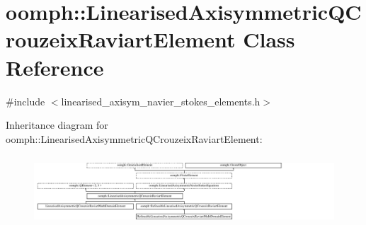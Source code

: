 \hypertarget{classoomph_1_1LinearisedAxisymmetricQCrouzeixRaviartElement}{}\section{oomph\+:\+:Linearised\+Axisymmetric\+Q\+Crouzeix\+Raviart\+Element Class Reference}
\label{classoomph_1_1LinearisedAxisymmetricQCrouzeixRaviartElement}


{\ttfamily \#include $<$linearised\+\_\+axisym\+\_\+navier\+\_\+stokes\+\_\+elements.\+h$>$}

Inheritance diagram for oomph\+:\+:Linearised\+Axisymmetric\+Q\+Crouzeix\+Raviart\+Element\+:\begin{figure}[H]
\begin{center}
\leavevmode
\includegraphics[height=2.629108cm]{classoomph_1_1LinearisedAxisymmetricQCrouzeixRaviartElement}
\end{center}
\end{figure}

